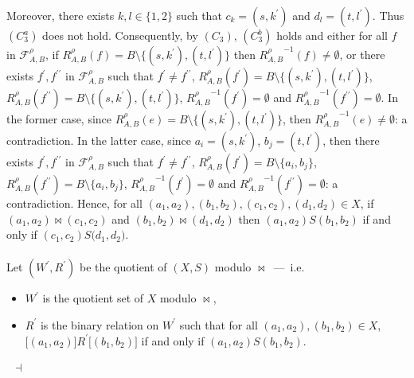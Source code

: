 \documentclass[draft]{article}
\newenvironment{proof}{{\bf Proof:}}{~$\dashv$\\}
\begin{document}
\begin{proof}
Moreover, there exists $k,l{\in}\{1,2\}$ such that $c_{k}{=}(s,k^{\prime})$ and $d_{l}{=}(t,l^{\prime})$.
Thus $(C_{3}^{a})$ does not hold.
Consequently, by $(C_{3})$, $(C_{3}^{b})$ holds and either for all $f$ in ${\mathcal F}_{A,B}^{\rho}$, if $R_{A,B}^{\rho}(f){=}B{\setminus}\{(s,k^{\prime}),(t,l^{\prime})\}$ then ${R_{A,B}^{\rho}}^{{-}1}(f){\not=}\emptyset$, or there exists $f^{\prime},f^{\prime\prime}$ in ${\mathcal F}_{A,B}^{\rho}$ such that $f^{\prime}{\not=}f^{\prime\prime}$, $R_{A,B}^{\rho}(f^{\prime}){=}B{\setminus}\{(s,k^{\prime}),(t,l^{\prime})\}$, $R_{A,B}^{\rho}(f^{\prime\prime}){=}
%
%
%
%
%
%
%
%
%
%
%
%
$\linebreak$
%
%
%
%
%
%
%
%
%
%
%
%
B{\setminus}\{(s,k^{\prime}),(t,l^{\prime})\}$, ${R_{A,B}^{\rho}}^{{-}1}(f^{\prime}){=}\emptyset$ and ${R_{A,B}^{\rho}}^{{-}1}(f^{\prime\prime}){=}\emptyset$.
In the former case, since $R_{A,B}^{\rho}(e){=}B{\setminus}\{(s,k^{\prime}),(t,l^{\prime})\}$, then ${R_{A,B}^{\rho}}^{{-}1}(e){\not=}\emptyset$: a contradiction.
In the latter case, since $a_{i}{=}(s,k^{\prime})$, $b_{j}{=}(t,l^{\prime})$, then there exists $f^{\prime},f^{\prime\prime}$ in ${\mathcal F}_{A,B}^{\rho}$ such that $f^{\prime}{\not=}f^{\prime\prime}$, $R_{A,B}^{\rho}(f^{\prime}){=}B{\setminus}\{a_{i},b_{j}\}$, $R_{A,B}^{\rho}(f^{\prime\prime}){=}B{\setminus}\{a_{i},b_{j}\}$, ${R_{A,B}^{\rho}}^{{-}1}(f^{\prime}){=}\emptyset$ and ${R_{A,B}^{\rho}}^{{-}1}(f^{\prime\prime}){=}
%
%
%
%
%
%
%
%
%
%
%
%
$\linebreak$
%
%
%
%
%
%
%
%
%
%
%
%
\emptyset$: a contradiction.
Hence, for all $(a_{1},a_{2}),(b_{1},b_{2}),(c_{1},c_{2}),(d_{1},d_{2}){\in}X$, if $(a_{1},a_{2})
%
%
%
%
%
%
%
%
%
%
%
%
$\linebreak$
%
%
%
%
%
%
%
%
%
%
%
%
{\bowtie}(c_{1},c_{2})$ and $(b_{1},b_{2}){\bowtie}(d_{1},d_{2})$ then $(a_{1},a_{2}){S}(b_{1},b_{2})$ if and only if $(c_{1},c_{2}){S}(d_{1},
%
%
%
%
%
%
%
%
%
%
%
%
$\linebreak$
%
%
%
%
%
%
%
%
%
%
%
%
d_{2})$.
%
%
\\
\\
%
%
Let $(W^{\prime},R^{\prime})$ be the quotient of $(X,S)$ modulo $\bowtie$~---~i.e.
%
%
\begin{itemize}
%
%
\item $W^{\prime}$ is the quotient set of $X$ modulo $\bowtie$,
%
%
\item $R^{\prime}$ is the binary relation on $W^{\prime}$ such that for all $(a_{1},a_{2}),(b_{1},b_{2}){\in}X$, $\lbrack(a_{1},a_{2})\rbrack{R^{\prime}}\lbrack(b_{1},b_{2})\rbrack$ if and only if $(a_{1},a_{2}){S}(b_{1},b_{2})$.

\end{itemize}
\end{proof}
\end{document}

